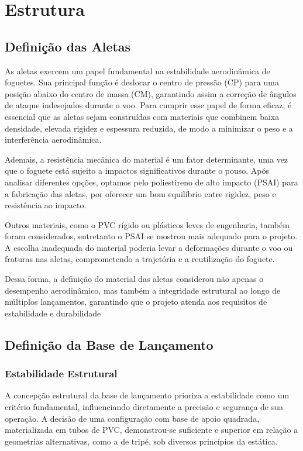\section{Estrutura}

\subsection{Definição das Aletas}
As aletas exercem um papel fundamental na estabilidade aerodinâmica de foguetes. Sua principal função é deslocar o centro de pressão (CP) para uma posição abaixo do centro de massa (CM), garantindo assim a correção de ângulos de ataque indesejados durante o voo. Para cumprir esse papel de forma eficaz, é essencial que as aletas sejam construídas com materiais que combinem baixa densidade, elevada rigidez e espessura reduzida, de modo a minimizar o peso e a interferência aerodinâmica. 

Ademais, a resistência mecânica do material é um fator determinante, uma vez que o foguete está sujeito a impactos significativos durante o pouso. Após analisar diferentes opções, optamos pelo poliestireno de alto impacto (PSAI) para a fabricação das aletas, por oferecer um bom equilíbrio entre rigidez, peso e resistência ao impacto. 

Outros materiais, como o PVC rígido ou plásticos leves de engenharia, também foram considerados, entretanto o PSAI se mostrou mais adequado para o projeto. A escolha inadequada do material poderia levar a deformações durante o voo ou fraturas nas aletas, comprometendo a trajetória e a reutilização do foguete. 

Dessa forma, a definição do material das aletas considerou não apenas o desempenho aerodinâmico, mas também a integridade estrutural ao longo de múltiplos lançamentos, garantindo que o projeto atenda aos requisitos de estabilidade e durabilidade 

\subsection{Definição da Base de Lançamento}

\subsubsection{Estabilidade Estrutural}
A concepção estrutural da base de lançamento prioriza a estabilidade como um critério fundamental, influenciando diretamente a precisão e segurança de sua operação. A decisão de uma configuração com base de apoio quadrada, materializada em tubos de PVC, demonstrou-se suficiente e superior em relação a geometrias alternativas, como a de tripé, sob diversos princípios da estática. 

